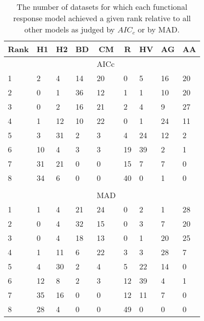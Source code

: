 \begin{table}[!tbp]
\caption{The number of datasets for which each functional response model achieved a given rank relative to all other models as judged by $AIC_c$ or by MAD.\label{table:AICc_and_MAD_rankings}} 
\begin{center}
\begin{tabular}{lllllllll}
\hline\hline
\multicolumn{1}{l}{Rank}&\multicolumn{1}{c}{H1}&\multicolumn{1}{c}{H2}&\multicolumn{1}{c}{BD}&\multicolumn{1}{c}{CM}&\multicolumn{1}{c}{R}&\multicolumn{1}{c}{HV}&\multicolumn{1}{c}{AG}&\multicolumn{1}{c}{AA}\tabularnewline
\hline
&&&&AICc&&&&\tabularnewline
1&2&4&14&20&0&5&16&20\tabularnewline
2&0&1&36&12&1&1&10&20\tabularnewline
3&0&2&16&21&2&4&9&27\tabularnewline
4&1&12&10&22&0&1&24&11\tabularnewline
5&3&31&2&3&4&24&12&2\tabularnewline
6&10&4&3&3&19&39&2&1\tabularnewline
7&31&21&0&0&15&7&7&0\tabularnewline
8&34&6&0&0&40&0&1&0\tabularnewline
&&&&&&&&\tabularnewline
&&&&MAD&&&&\tabularnewline
1&1&4&21&24&0&2&1&28\tabularnewline
2&0&4&32&15&0&3&7&20\tabularnewline
3&0&4&18&13&0&1&20&25\tabularnewline
4&1&11&6&22&3&3&28&7\tabularnewline
5&4&30&2&4&5&22&14&0\tabularnewline
6&12&8&2&3&12&39&4&1\tabularnewline
7&35&16&0&0&12&11&7&0\tabularnewline
8&28&4&0&0&49&0&0&0\tabularnewline
\hline
\end{tabular}\end{center}
\end{table}
